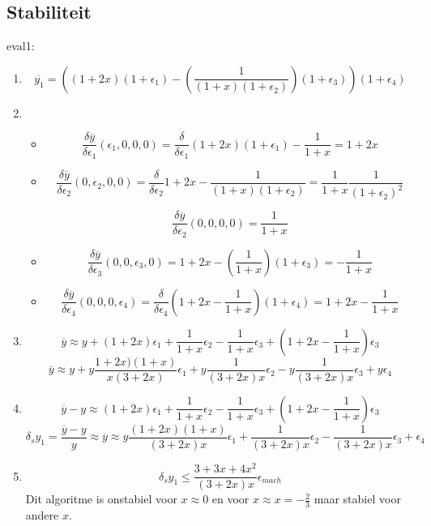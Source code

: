 \documentclass[12pt,a4paper]{article}
\begin{document}
\subsection{Stabiliteit}
eval1:
\begin{enumerate}
\item
\[
\overline{y_1} = \left((1+2x)(1+\epsilon_1)-\left(\frac{1}{(1+x)(1+\epsilon_2)}\right)(1+\epsilon_3)\right)(1+\epsilon_4)
\]
\item
\begin{itemize}
\item
\[
\frac{\delta\overline{y}}{\delta\epsilon_1}(\epsilon_1,0,0,0)
= \frac{\delta}{\delta\epsilon_1}(1+2x)(1+\epsilon_1)-\frac{1}{1+x}
= 1+2x
\]

\item
\[
\frac{\delta\overline{y}}{\delta\epsilon_2}(0,\epsilon_2,0,0)
= \frac{\delta}{\delta\epsilon_2}1+2x-\frac{1}{(1+x)(1+\epsilon_2)}=\frac{1}{1+x}\frac{1}{(1+\epsilon_2)^2}
\]

\[
\frac{\delta\overline{y}}{\delta\epsilon_2}(0,0,0,0)
= \frac{1}{1+x}
\]

\item
\[
\frac{\delta\overline{y}}{\delta\epsilon_3}(0,0,\epsilon_3,0)
= 1+2x-(\frac{1}{1+x})(1+\epsilon_3)
= -\frac{1}{1+x}
\]

\item
\[
\frac{\delta\overline{y}}{\delta\epsilon_4}(0,0,0,\epsilon_4)
= \frac{\delta}{\delta\epsilon_4}(1+2x-\frac{1}{1+x})(1+\epsilon_4)
= 1+2x-\frac{1}{1+x}
\]

\end{itemize}

\item
\[
\overline{y} \approx y
+ (1+2x)\epsilon_1
+ \frac{1}{1+x}\epsilon_2
- \frac{1}{1+x}\epsilon_3
+ \left(1+2x-\frac{1}{1+x}\right)\epsilon_3
\]
\[
\overline{y} \approx y
+ y\frac{1+2x)(1+x)}{x(3+2x)}\epsilon_1
+ y\frac{1}{(3+2x)x}\epsilon_2
- y\frac{1}{(3+2x)x}\epsilon_3
+ y\epsilon_4
\]

\item
\[
\overline{y} - y
\approx
  (1+2x)\epsilon_1
+ \frac{1}{1+x}\epsilon_2
- \frac{1}{1+x}\epsilon_3
+ \left(1+2x-\frac{1}{1+x}\right)\epsilon_3
\]
\[
\delta_{s}y_1 =
\frac{\overline{y} - y}{y}
\approx
\overline{y} \approx y
  \frac{(1+2x)(1+x)}{(3+2x)x}\epsilon_1
+ \frac{1}{(3+2x)x}\epsilon_2
- \frac{1}{(3+2x)x}\epsilon_3
+ \epsilon_4
\]
\item
\[
\delta_{s}y_1 \le  \frac{3+3x+4x^2}{(3+2x)x}\epsilon_{mach}
\]
Dit algoritme is onstabiel voor $x\approx 0$ en voor $x\approx x = -\frac{2}{3}$ maar stabiel voor andere $x$.

\end{enumerate}
\end{document}
